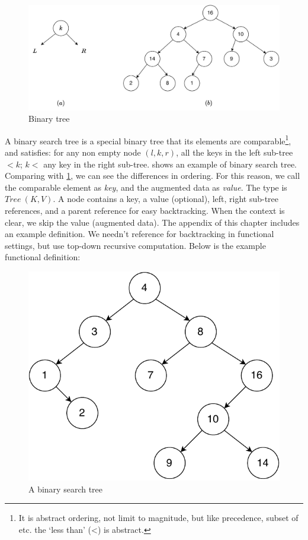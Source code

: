 \documentclass[b5paper]{article}
\begin{document}
\begin{figure}[htbp]
  \centering
  \includegraphics[scale=0.5]{img/binary-tree}
  \caption{Binary tree}
  \label{fig:binary-tree-example}
\end{figure}

A binary search tree is a special binary tree that its elements are comparable\footnote{It is abstract ordering, not limit to magnitude, but like precedence, subset of etc. the `less than' (<) is abstract.}, and satisfies: for any non empty node $(l, k, r)$, all the keys in the left sub-tree $< k$; $k <$ any key in the right sub-tree.  shows an example of binary search tree. Comparing with \cref{fig:binary-tree-example}, we can see the differences in ordering. For this reason, we call the comparable element as {\em key}, and the augmented data as {\em value}. The type is $Tree\ (K, V)$. A node contains a key, a value (optional), left, right sub-tree references, and a parent reference for easy backtracking. When the context is clear, we skip the value (augmented data). The appendix of this chapter includes an example definition. We needn't reference for backtracking in functional settings, but use top-down recursive computation. Below is the example functional definition:

\begin{figure}[htbp]
  \begin{center}
   \includegraphics[scale=0.5]{img/bst-example}
   \caption{A binary search tree} \label{fig:bst-example}
  \end{center}
\end{figure}
\end{document}
